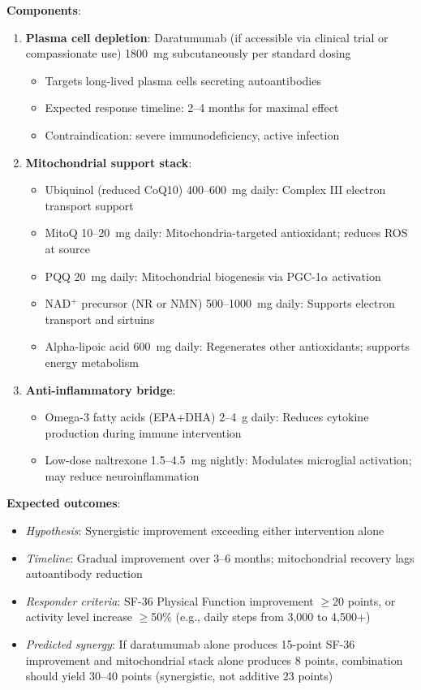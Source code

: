 \textbf{Components}:
\begin{enumerate}
    \item \textbf{Plasma cell depletion}: Daratumumab (if accessible via clinical trial or compassionate use) 1800~mg subcutaneously per standard dosing~\cite{Fluge2025daratumumab}
    \begin{itemize}
        \item Targets long-lived plasma cells secreting autoantibodies
        \item Expected response timeline: 2--4 months for maximal effect
        \item Contraindication: severe immunodeficiency, active infection
    \end{itemize}

    \item \textbf{Mitochondrial support stack}:
    \begin{itemize}
        \item Ubiquinol (reduced CoQ10) 400--600~mg daily: Complex III electron transport support
        \item MitoQ 10--20~mg daily: Mitochondria-targeted antioxidant; reduces ROS at source
        \item PQQ 20~mg daily: Mitochondrial biogenesis via PGC-1$\alpha$ activation
        \item NAD$^+$ precursor (NR or NMN) 500--1000~mg daily: Supports electron transport and sirtuins
        \item Alpha-lipoic acid 600~mg daily: Regenerates other antioxidants; supports energy metabolism
    \end{itemize}

    \item \textbf{Anti-inflammatory bridge}:
    \begin{itemize}
        \item Omega-3 fatty acids (EPA+DHA) 2--4~g daily: Reduces cytokine production during immune intervention
        \item Low-dose naltrexone 1.5--4.5~mg nightly: Modulates microglial activation; may reduce neuroinflammation
    \end{itemize}
\end{enumerate}

\textbf{Expected outcomes}:
\begin{itemize}
    \item \textit{Hypothesis}: Synergistic improvement exceeding either intervention alone
    \item \textit{Timeline}: Gradual improvement over 3--6 months; mitochondrial recovery lags autoantibody reduction
    \item \textit{Responder criteria}: SF-36 Physical Function improvement $\geq$20 points, or activity level increase $\geq$50\% (e.g., daily steps from 3,000 to 4,500+)
    \item \textit{Predicted synergy}: If daratumumab alone produces 15-point SF-36 improvement and mitochondrial stack alone produces 8 points, combination should yield 30--40 points (synergistic, not additive 23 points)
\end{itemize}

